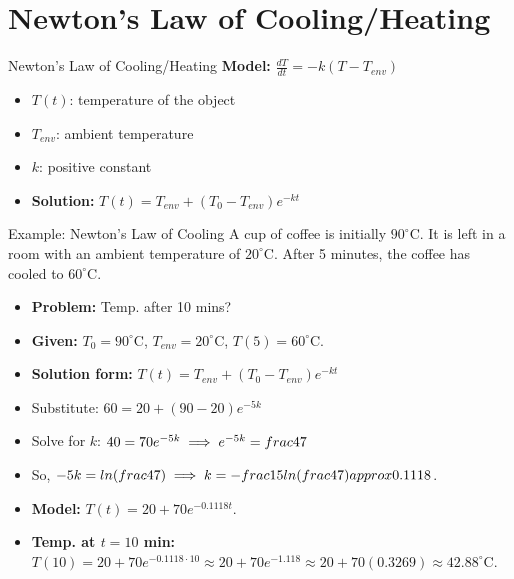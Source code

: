 \documentclass[10pt,aspectratio=169]{beamer}
\begin{document}
\section{Newton's Law of Cooling/Heating}
\begin{frame}{Newton's Law of Cooling/Heating}
    \textbf{Model:} $\frac{dT}{dt} = -k(T - T_{env})$
    \begin{itemize}
        \item $T(t)$: temperature of the object
        \item $T_{env}$: ambient temperature
        \item $k$: positive constant
        \item \textbf{Solution:} $T(t) = T_{env} + (T_0 - T_{env})e^{-kt}$
    \end{itemize}
\end{frame}

\begin{frame}{Example: Newton's Law of Cooling}
    A cup of coffee is initially $90^{\circ}\text{C}$. It is left in a room with an ambient temperature of $20^{\circ}\text{C}$. After 5 minutes, the coffee has cooled to $60^{\circ}\text{C}$.
    \begin{itemize}
        \item \textbf{Problem:} Temp. after 10 mins?
        \item \textbf{Given:} $T_0 = 90^{\circ}\text{C}$, $T_{env} = 20^{\circ}\text{C}$, $T(5) = 60^{\circ}\text{C}$.
        \item \textbf{Solution form:} $T(t) = T_{env} + (T_0 - T_{env})e^{-kt}$
        \item Substitute: $60 = 20 + (90 - 20)e^{-5k}$
        \item Solve for $k$: $40 = 70e^{-5k} \implies e^{-5k} = \\frac{4}{7}$
        \item So, $-5k = \\ln(\\frac{4}{7}) \implies k = -\\frac{1}{5}\\ln(\\frac{4}{7}) \\approx 0.1118$.
        \item \textbf{Model:} $T(t) = 20 + 70e^{-0.1118t}$.
        \item \textbf{Temp. at $t=10$ min:} $T(10) = 20 + 70e^{-0.1118 \cdot 10} \approx 20 + 70e^{-1.118} \approx 20 + 70(0.3269) \approx 42.88^{\circ}\text{C}$.
    \end{itemize}
\end{frame}
\end{document}
